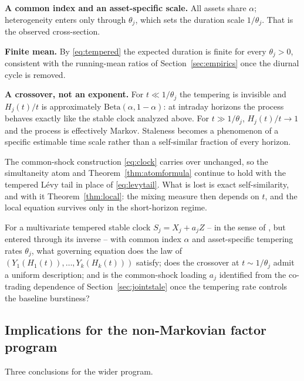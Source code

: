 \documentclass{ws-ijtaf}
\newcommand{\Bet}{\mathrm{Beta}}
\begin{document}
\begin{arabiclist}
\item \textbf{A common index and an asset-specific scale.} All assets share
$\alpha$; heterogeneity enters only through $\theta_j$, which sets the duration
scale $1/\theta_j$. That is the observed cross-section.
\item \textbf{Finite mean.} By \eqref{eq:tempered} the expected duration is
finite for every $\theta_j>0$, consistent with the running-mean ratios of
Section~\ref{sec:empirics} once the diurnal cycle is removed.
\item \textbf{A crossover, not an exponent.} For $t\ll1/\theta_j$ the tempering
is invisible and $H_j(t)/t$ is approximately $\Bet(\alpha,1-\alpha)$: at
intraday horizons the process behaves exactly like the stable clock analyzed
above. For $t\gg1/\theta_j$, $H_j(t)/t\to1$ and the process is effectively
Markov. Staleness becomes a phenomenon of a specific estimable time scale rather
than a self-similar fraction of every horizon.
\end{arabiclist}

The common-shock construction \eqref{eq:clock} carries over unchanged, so the
simultaneity atom and Theorem~\ref{thm:atomformula} continue to hold with the
tempered L\'evy tail in place of \eqref{eq:levytail}. What is lost is exact
self-similarity, and with it Theorem~\ref{thm:local}: the mixing measure then
depends on $t$, and the local equation survives only in the short-horizon
regime.

\begin{question}\label{q:tempered}
For a multivariate tempered stable clock $S_j=X_j+a_jZ$ -- in the sense of
\citet{sem22}, but entered through its inverse -- with common index $\alpha$ and
asset-specific tempering rates $\theta_j$, what governing equation does the law
of $(Y_1(H_1(t)),\dots,Y_k(H_k(t)))$ satisfy; does the crossover at
$t\sim1/\theta_j$ admit a uniform description; and is the common-shock loading
$a_j$ identified from the co-trading dependence of
Section~\ref{sec:jointstale} once the tempering rate controls the baseline
burstiness?
\end{question}

\subsection{Implications for the non-Markovian factor program}

Three conclusions for the wider program.
\end{document}
